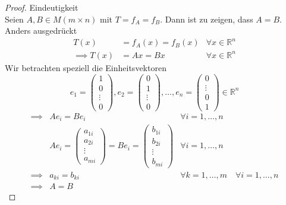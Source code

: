 \begin{proof}
    Eindeutigkeit\\
    Seien $A,B \in M(m\times n)$ mit $T=f_A=f_B$. Dann ist zu zeigen, dass $A=B$. Anders ausgedrückt
    \begin{align*}
        T(x) &= f_A(x) = f_B(x)&\forall x\in \mathbb{R}^n\\
        \implies T(x) &= Ax = Bx &\forall x\in \mathbb{R}^n
    \end{align*}
    Wir betrachten speziell die Einheitsvektoren
    \[
        e_1 = \begin{pmatrix}
            1\\0\\\vdots\\ 0
        \end{pmatrix}, e_2 = \begin{pmatrix}
            0\\1\\\vdots\\0
        \end{pmatrix},\dots, e_n = \begin{pmatrix}
            0\\\vdots\\0\\1
        \end{pmatrix}\in\mathbb{R}^n
    \]
    \begin{align*}
        \implies &Ae_i = Be_i &\forall i = 1,\dots,n\\
        &Ae_i = \begin{pmatrix}
            a_{1i}\\a_{2i}\\\vdots\\a_{mi}
        \end{pmatrix} = Be_i=\begin{pmatrix}
            b_{1i}\\b_{2i}\\\vdots\\b_{mi}
        \end{pmatrix} & \forall i = 1,\dots,n\\
        \implies &a_{ki} = b_{ki}&\forall k=1,\dots,m\quad\forall i = 1,\dots,n\\
        \implies & A= B
    \end{align*}
\end{proof}
